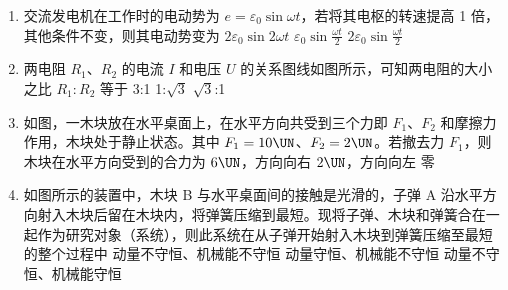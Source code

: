 \documentclass[\gkver]{gaokaozhenti}
\begin{document}
\begin{enumerate}
\item
交流发电机在工作时的电动势为 $e=\varepsilon_{0}\sin\omega t$，若将其电枢的转速提高 1 倍，其他条件不变，则其电动势变为
{$2\varepsilon_{0}\sin2\omega t$}
{$\varepsilon_{0}\sin\frac{\omega t}{2}$}
{$2\varepsilon_{0}\sin\frac{\omega t}{2}$}


\item
两电阻 $R_{1}$、$R_{2}$ 的电流 $I$ 和电压 $U$ 的关系图线如图所示，可知两电阻的大小之比 $R_{1}:R_{2}$ 等于
{3:1}
{1:$\sqrt{3}$}
{$\sqrt{3}$:1}


\item
如图，一木块放在水平桌面上，在水平方向共受到三个力即 $F_{1}$、$F_{2}$ 和摩擦力作用，木块处于静止状态。其中 $F_{1}=10\UN$、$F_{2}=2\UN$。若撤去力 $F_{1}$，则木块在水平方向受到的合力为
\onepicture[w=6cm]{}
{$6\UN$，方向向右}
{$2\UN$，方向向左}
{零}


\item
如图所示的装置中，木块 B 与水平桌面间的接触是光滑的，子弹 A 沿水平方向射入木块后留在木块内，将弹簧压缩到最短。现将子弹、木块和弹簧合在一起作为研究对象（系统），则此系统在从子弹开始射入木块到弹簧压缩至最短的整个过程中
\onepicture[w=6cm]{}
{动量不守恒、机械能不守恒}
{动量守恒、机械能不守恒}
{动量不守恒、机械能守恒}


\end{enumerate}
\end{document}
